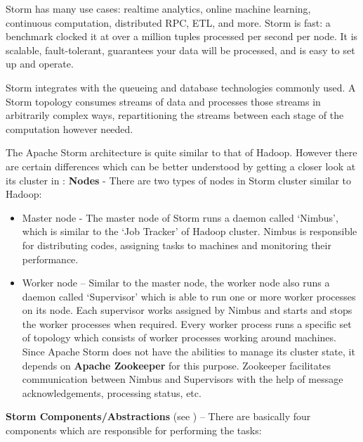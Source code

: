 Storm has many use cases: realtime analytics, online machine learning, continuous computation, distributed RPC, ETL, and more. Storm is fast: a benchmark clocked it at over a million tuples processed per second per node. It is scalable, fault-tolerant, guarantees your data will be processed, and is easy to set up and operate.

Storm integrates with the queueing and database technologies commonly used. A Storm topology consumes streams of data and processes those streams in arbitrarily complex ways, repartitioning the streams between each stage of the computation however needed. 

The Apache Storm architecture is quite similar to that of Hadoop. However there are certain differences which can be better understood by getting a closer look at its cluster in : 
\textbf{Nodes} - There are two types of nodes in Storm cluster similar to Hadoop:
\begin{itemize}
	\item {Master node - }The master node of Storm runs a daemon called ‘Nimbus’, which is similar to the ‘Job Tracker’ of Hadoop cluster. Nimbus is responsible for distributing codes, assigning tasks to machines and monitoring their performance.
	\item {Worker node – }Similar to the master node, the worker node also runs a daemon called ‘Supervisor’ which is able to run one or more worker processes on its node. Each supervisor works assigned by Nimbus and starts and stops the worker processes when required. Every worker process runs a specific set of topology which consists of worker processes working around machines. Since Apache Storm does not have the abilities to manage its cluster state, it depends on \textbf{Apache Zookeeper} for this purpose. Zookeeper facilitates communication between Nimbus and Supervisors with the help of message acknowledgements, processing status, etc.
\end{itemize}
\textbf{Storm Components/Abstractions} (see  ) – There are basically four components which are responsible for performing the tasks:

